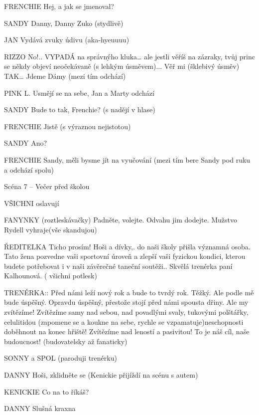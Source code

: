 FRENCHIE        Hej, a jak se jmenoval?

SANDY        Danny, Danny Zuko (stydlivě)

JAN        Vydává zvuky údivu (aka-hyeuuuu)

RIZZO        No!.. VYPADÁ na správnýho kluka… ale jestli věříš na zázraky, tvůj princ         se někdy objeví neočekávaně (s lehkým úsměvem)... Věř mi (šklebivý         úsměv) TAK… Jdeme Dámy (mezi tím odchází)

PINK L.         Usmějí se na sebe, Jan a Marty odchází

SANDY        Bude to tak, Frenchie? (s nadějí v hlase)

FRENCHIE        Jistě (s výraznou nejistotou)

SANDY        Ano? 

FRENCHIE        Sandy, měli bysme jít na vyučování (mezi tím bere Sandy pod ruku a         odchází spolu)





Scéna 7 – Večer před školou

VŠICHNI                         oslavují 

      FANYNKY (roztleskávačky) Padněte, volejte. Odvahu jim dodejte. Mužstvo Rydell                                vyhraje(vše skandujou)

ŘEDITELKA         Ticho prosím! Hoši a dívky,. do naši školy přišla významná osoba.                  Tato žena pozvedne vaši sportovní úroveň a zlepší vaši fyzickou kondici,         kterou budete potřebovat i v naši závěrečné taneční soutěži.. Skvělá         trenérka paní Kalhounová. ( všichni potlesk)

TRENÉRKA::         Před námi leží nový rok a bude to tvrdý rok. Těžký. Ale podle mě bude         úspěšný. Opravdu úspěšný, přestože stojí před námi spousta dřiny.  Ale         my zvítězíme! Zvítězíme samy nad sebou, nad povadlými svaly,                 tukovými polštářky, celulitidou (zapomene se a koukne na sebe, rychle         se vzpamatuje)neschopnosti doběhnout na konec hřiště! Zvítězíme nad         leností a pasivitou!  To je náš cíl, naše budoucnost! (budovatelsky až         fanaticky)    

 SONNY a SPOL  (paroduji trenérku)

 DANNY        Hoši, zklidněte se  (Kenickie přijíždí na scénu s autem)

KENICKIE        Co na to říkáš?

DANNY        Slušná kraxna

